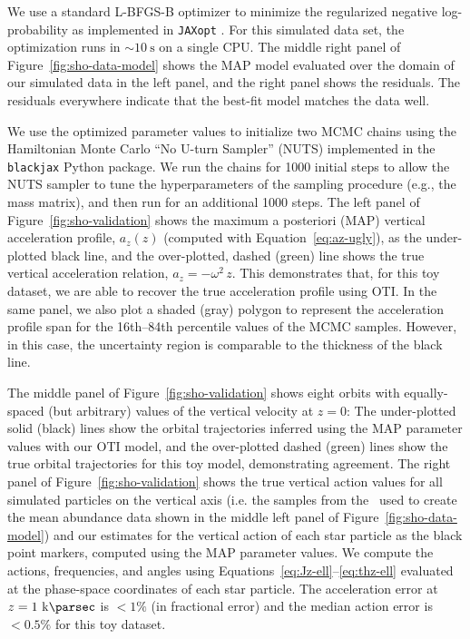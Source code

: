 We use a standard L-BFGS-B optimizer \citep{Byrd:1995} to minimize the regularized
negative log-probability as implemented in \texttt{JAXopt} \cite{jaxopt:2021}.
For this simulated data set, the optimization runs in $\sim 10~\unit{\second}$ on a
single CPU.
The middle right panel of Figure~\ref{fig:sho-data-model} shows the MAP model evaluated
over the domain of our simulated data in the left panel, and the right panel shows the
residuals.
The residuals everywhere indicate that the best-fit model matches the data well.

We use the optimized parameter values to initialize two MCMC chains using the
Hamiltonian Monte Carlo ``No U-turn Sampler'' (NUTS) implemented in the
\texttt{blackjax} \citep{blackjax} Python package.
We run the chains for 1000 initial steps to allow the NUTS sampler to tune the
hyperparameters of the sampling procedure (e.g., the mass matrix), and then run for an
additional 1000 steps.
The left panel of Figure~\ref{fig:sho-validation} shows the maximum a posteriori (MAP)
vertical acceleration profile, $a_z(z)$ (computed with Equation~\ref{eq:az-ugly}), as
the under-plotted black line, and the over-plotted, dashed (green) line shows the true
vertical acceleration relation, $a_z = -\omega^2 \, z$.
This demonstrates that, for this toy dataset, we are able to recover the true
acceleration profile using OTI.
In the same panel, we also plot a shaded (gray) polygon to represent the acceleration
profile span for the 16th--84th percentile values of the MCMC samples.
However, in this case, the uncertainty region is comparable to the thickness of the
black line.

The middle panel of Figure~\ref{fig:sho-validation} shows eight orbits with
equally-spaced (but arbitrary) values of the vertical velocity at $z=0$: The
under-plotted solid (black) lines show the orbital trajectories inferred using the MAP
parameter values with our OTI model, and the over-plotted dashed (green) lines show the
true orbital trajectories for this toy model, demonstrating agreement.
The right panel of Figure~\ref{fig:sho-validation} shows the true vertical action values
for all simulated particles on the vertical axis (i.e. the samples from the \df\ used to
create the mean abundance data shown in the middle left panel of
Figure~\ref{fig:sho-data-model}) and our estimates for the vertical action of each star
particle as the black point markers, computed using the MAP parameter values.
We compute the actions, frequencies, and angles using
Equations~\ref{eq:Jz-ell}--\ref{eq:thz-ell} evaluated at the phase-space coordinates of
each star particle.
The acceleration error at $z=1~\kpc$ is $< 1\%$ (in fractional error) and the median
action error is $<0.5\%$ for this toy dataset.

